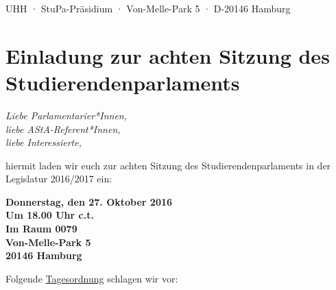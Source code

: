 \documentclass[ngerman,headheight=70pt]{scrartcl}
\begin{document}
    UHH · StuPa-Präsidium · Von-Melle-Park 5 · D-20146 Hamburg

    \section*{Einladung zur achten Sitzung des Studierendenparlaments}

    \textit{Liebe Parlamentarier*Innen,\\
    liebe AStA-Referent*Innen,\\
    liebe Interessierte,}

    hiermit laden wir euch zur achten Sitzung des Studierendenparlaments
    in der Legislatur 2016/2017 ein:

    \textbf{Donnerstag, den 27. Oktober 2016\\
    Um 18.00 Uhr c.t.\\
    Im Raum 0079\\
    Von-Melle-Park 5\\
    20146 Hamburg}

    Folgende \underline{Tagesordnung} schlagen wir vor:
\end{document}
